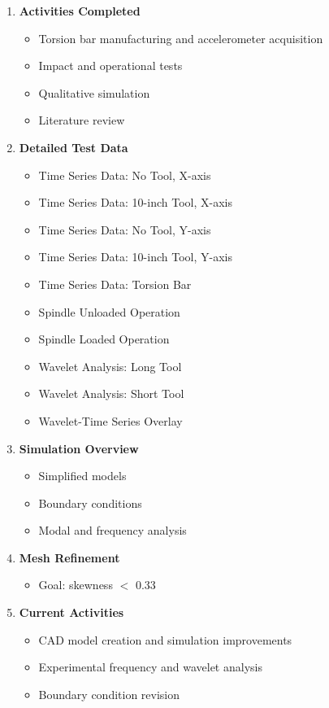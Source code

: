 \documentclass[9pt]{article}
\theoremstyle{definition} %
\theoremstyle{plain} %
\begin{document}
\begin{enumerate}
    
    \item \textbf{Activities Completed}
    \begin{itemize}
        \item Torsion bar manufacturing and accelerometer acquisition
        \item Impact and operational tests
        \item Qualitative simulation
        \item Literature review
    \end{itemize}

    \item \textbf{Detailed Test Data}
    \begin{itemize}
        \item Time Series Data: No Tool, X-axis
        \item Time Series Data: 10-inch Tool, X-axis
        \item Time Series Data: No Tool, Y-axis
        \item Time Series Data: 10-inch Tool, Y-axis
        \item Time Series Data: Torsion Bar
        \item Spindle Unloaded Operation
        \item Spindle Loaded Operation
        \item Wavelet Analysis: Long Tool
        \item Wavelet Analysis: Short Tool
        \item Wavelet-Time Series Overlay
    \end{itemize}

    \item \textbf{Simulation Overview}
    \begin{itemize}
        \item Simplified models
        \item Boundary conditions
        \item Modal and frequency analysis
    \end{itemize}

    \item \textbf{Mesh Refinement}
    \begin{itemize}
        \item Goal: skewness $<$ 0.33
    \end{itemize}

    \item \textbf{Current Activities}
    \begin{itemize}
        \item CAD model creation and simulation improvements
        \item Experimental frequency and wavelet analysis
        \item Boundary condition revision
    \end{itemize}


\end{enumerate}
\end{document}
